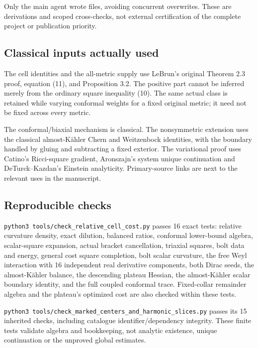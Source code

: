 \documentclass[
  10pt,
]{article}
\begin{document}
Only the main agent wrote files, avoiding concurrent overwrites. These
are derivations and scoped cross-checks, not external certification of
the complete project or publication priority.

\hypertarget{classical-inputs-actually-used}{%
\subsection{Classical inputs actually
used}\label{classical-inputs-actually-used}}

The cell identities and the all-metric supply use LeBrun's original
Theorem 2.3 proof, equation (11), and Proposition 3.2. The positive part
cannot be inferred merely from the ordinary square inequality (10). The
same actual class is retained while varying conformal weights for a
fixed original metric; it need not be fixed across every metric.

The conformal/biaxial mechanism is classical. The nonsymmetric extension
uses the classical almost-Kähler Chern and Weitzenbock identities, with
the boundary handled by gluing and subtracting a fixed exterior. The
variational proof uses Catino's Ricci-square gradient, Aronszajn's
system unique continuation and DeTurck--Kazdan's Einstein analyticity.
Primary-source links are next to the relevant uses in the manuscript.

\hypertarget{reproducible-checks-1}{%
\subsection{Reproducible checks}\label{reproducible-checks-1}}

\texttt{python3\ tools/\nolinkurl{check_relative_cell_cost.py}} passes 16 exact
tests: relative curvature density, exact dilution, balanced ratios,
conformal lower-bound algebra, scalar-square expansion, actual bracket
cancellation, triaxial squares, bolt data and energy, general cost
square completion, bolt scalar curvature, the free Weyl interaction with
16 independent real derivative components, both Dirac seeds, the
almost-Kähler balance, the descending plateau Hessian, the almost-Kähler
scalar boundary identity, and the full coupled conformal trace.
Fixed-collar remainder algebra and the plateau's optimized cost are also
checked within these tests.

\texttt{python3\ tools/\nolinkurl{check_marked_centers_and_harmonic_slices.py}}
passes its 15 inherited checks, including catalogue
identifier/dependency integrity. These finite tests validate algebra and
bookkeeping, not analytic existence, unique continuation or the unproved
global estimates.
\end{document}
